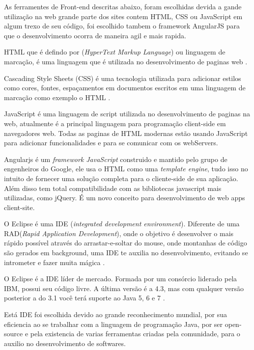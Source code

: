 
As ferramentes de Front-end descritas abaixo, foram escolhidas devida a gande utilização na web grande parte dos sites contem HTML, CSS ou JavaScript em algum trexo de seu código, foi escolhido tambem o framework AngularJS para que o desenvolvimento ocorra de maneira agil e mais rapida.\par

HTML que é defindo por (\textit{HyperText Markup Language}) ou linguagem de marcação, é uma linguagem que é utilizada no desenvolvimento de paginas web \cite{html}.\par

Cascading Style Sheets (CSS) é uma tecnologia utilizada para adicionar estilos como cores, fontes, espaçamentos em documentos escritos em uma linguagem de marcação como exemplo o HTML \cite{css}.\par


JavaScript é uma linguagem de script utilizada no desenvolvimento de paginas na web, atualmente é a principal linguagem para programação client-side em navegadores web. Todas as paginas de HTML modernas estão usando JavaScript para adicionar funcionalidades e para se comunicar com os webServers\cite{javascript}.\par

Angularjs é um \textit{framework JavaScript} construido e mantido pelo grupo de engenheiros do Google, ele usa o HTML como uma \textit{template engine}, tudo isso no intuito de fornecer uma solução completa para o cliente-side de sua aplicação. Além disso tem total compatibilidade com as bibliotecas javascript mais utilizadas, como jQuery. É um novo conceito para desenvolvimento de web apps client-site.\cite{angularjs}\par


O Eclipse é uma IDE (\textit{integrated development environment}). Diferente de uma RAD(\textit{Rapid Application Development}), onde o objetivo é desenvolver o mais rápido possível através do arrastar-e-soltar do mouse, onde montanhas de código são gerados em background, uma IDE te auxilia no desenvolvimento, evitando se intrometer e fazer muita mágica \cite{caelum}.\par

O Eclipse é a IDE líder de mercado. Formada por um consórcio liderado pela IBM, possui seu código livre. A última versão é a 4.3, mas com qualquer versão posterior a do 3.1 você terá suporte ao Java 5, 6 e 7 \cite{caelum}.\par

Está IDE foi escolhida devido ao grande reconhecimento mundial, por sua eficiencia ao se trabalhar com a linguagem de programação Java, por ser open-source e pela existencia de varias ferramentas criadas pela comunidade, para o auxilio no desenvolvimento de softwares.\par